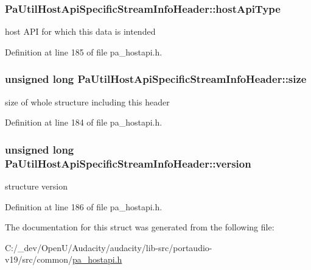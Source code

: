 \subsubsection[{\texorpdfstring{host\+Api\+Type}{hostApiType}}]{ Pa\+Util\+Host\+Api\+Specific\+Stream\+Info\+Header\+::host\+Api\+Type}\hypertarget{struct_pa_util_host_api_specific_stream_info_header_aff56933cb47b596b6786dee809d0b29f}{}\label{struct_pa_util_host_api_specific_stream_info_header_aff56933cb47b596b6786dee809d0b29f}
host A\+PI for which this data is intended 

Definition at line 185 of file pa\+\_\+hostapi.\+h.

\subsubsection[{\texorpdfstring{size}{size}}]{\setlength{\rightskip}{0pt plus 5cm}unsigned long Pa\+Util\+Host\+Api\+Specific\+Stream\+Info\+Header\+::size}\hypertarget{struct_pa_util_host_api_specific_stream_info_header_a5d849a7ce54b016c9c2603163bd074f5}{}\label{struct_pa_util_host_api_specific_stream_info_header_a5d849a7ce54b016c9c2603163bd074f5}
size of whole structure including this header 

Definition at line 184 of file pa\+\_\+hostapi.\+h.

\subsubsection[{\texorpdfstring{version}{version}}]{\setlength{\rightskip}{0pt plus 5cm}unsigned long Pa\+Util\+Host\+Api\+Specific\+Stream\+Info\+Header\+::version}\hypertarget{struct_pa_util_host_api_specific_stream_info_header_ac680579e35ad683da774a3dd1cb38174}{}\label{struct_pa_util_host_api_specific_stream_info_header_ac680579e35ad683da774a3dd1cb38174}
structure version 

Definition at line 186 of file pa\+\_\+hostapi.\+h.



The documentation for this struct was generated from the following file\+:\begin{DoxyCompactItemize}
\item 
C\+:/\+\_\+dev/\+Open\+U/\+Audacity/audacity/lib-\/src/portaudio-\/v19/src/common/\hyperlink{pa__hostapi_8h}{pa\+\_\+hostapi.\+h}\end{DoxyCompactItemize}

